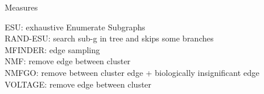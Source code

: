 \documentclass[8pt]{beamer}
\begin{document}
\begin{frame}{Measures}


ESU: exhaustive Enumerate Subgraphs \\

RAND-ESU: search sub-g in tree and skips some branches \\

MFINDER: edge sampling \\

NMF: remove edge between cluster \\

NMFGO: remove between cluster edge + biologically insignificant edge \\

VOLTAGE: remove edge between cluster \\


\end{frame}
\end{document}
